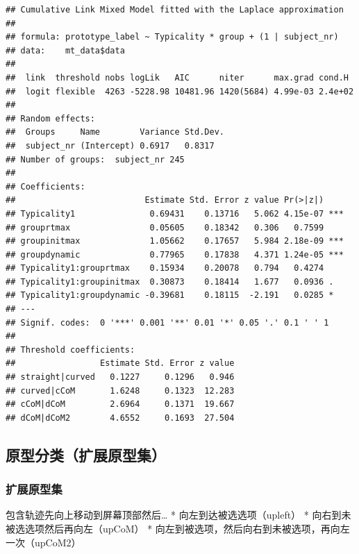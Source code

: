 \documentclass[
]{article}
\begin{document}
\begin{verbatim}
## Cumulative Link Mixed Model fitted with the Laplace approximation
## 
## formula: prototype_label ~ Typicality * group + (1 | subject_nr)
## data:    mt_data$data
## 
##  link  threshold nobs logLik   AIC      niter      max.grad cond.H 
##  logit flexible  4263 -5228.98 10481.96 1420(5684) 4.99e-03 2.4e+02
## 
## Random effects:
##  Groups     Name        Variance Std.Dev.
##  subject_nr (Intercept) 0.6917   0.8317  
## Number of groups:  subject_nr 245 
## 
## Coefficients:
##                          Estimate Std. Error z value Pr(>|z|)    
## Typicality1               0.69431    0.13716   5.062 4.15e-07 ***
## grouprtmax                0.05605    0.18342   0.306   0.7599    
## groupinitmax              1.05662    0.17657   5.984 2.18e-09 ***
## groupdynamic              0.77965    0.17838   4.371 1.24e-05 ***
## Typicality1:grouprtmax    0.15934    0.20078   0.794   0.4274    
## Typicality1:groupinitmax  0.30873    0.18414   1.677   0.0936 .  
## Typicality1:groupdynamic -0.39681    0.18115  -2.191   0.0285 *  
## ---
## Signif. codes:  0 '***' 0.001 '**' 0.01 '*' 0.05 '.' 0.1 ' ' 1
## 
## Threshold coefficients:
##                 Estimate Std. Error z value
## straight|curved   0.1227     0.1296   0.946
## curved|cCoM       1.6248     0.1323  12.283
## cCoM|dCoM         2.6964     0.1371  19.667
## dCoM|dCoM2        4.6552     0.1693  27.504
\end{verbatim}

\subsection{原型分类（扩展原型集）}\label{ux539fux578bux5206ux7c7bux6269ux5c55ux539fux578bux96c6}

\subsubsection{扩展原型集}\label{ux6269ux5c55ux539fux578bux96c6}

包含轨迹先向上移动到屏幕顶部然后\ldots{} * 向左到达被选选项（upleft） *
向右到未被选选项然后再向左（upCoM） *
向左到被选项，然后向右到未被选项，再向左一次（upCoM2）
\end{document}
